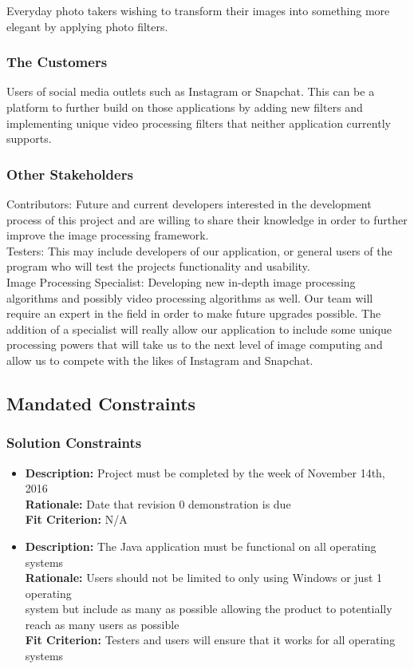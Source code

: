 \documentclass[12pt, titlepage]{article}
\begin{document}
Everyday photo takers wishing to transform their images into something more elegant by applying photo filters. 

\subsubsection{The Customers}

Users of social media outlets such as Instagram or Snapchat. This can be a platform to further build on those applications by adding new filters and implementing unique video processing filters that neither application currently supports. 

\subsubsection{Other Stakeholders}

Contributors: Future and current developers interested in the development process of this project and are willing to share their knowledge in order to further improve the image processing framework.\\

Testers: This may include developers of our application, or general users of the program who will test the projects functionality and usability.\\

Image Processing Specialist: Developing new in-depth image processing algorithms and possibly video processing algorithms as well. Our team will require an expert in the field in order to make future upgrades possible. The addition of a specialist will really allow our application to include some unique processing powers that will take us to the next level of image computing and allow us to compete with the likes of Instagram and Snapchat.


\subsection{Mandated Constraints}

\subsubsection{Solution Constraints}
\begin{itemize}
  \item {\bf Description:} Project must be completed by the week of November 14th, 2016\\
        {\bf Rationale:} Date that revision 0 demonstration is due\\
        {\bf Fit Criterion:} N/A \\
  \item {\bf Description:} The Java application must be functional on all operating systems\\
        {\bf Rationale:} Users should not be limited to only using Windows or just 1 operating\\ system but include as many as possible allowing the product to potentially reach as many users as possible\\
        {\bf Fit Criterion:} Testers and users will ensure that it works for all operating systems
  \end{itemize}
  
\end{document}
